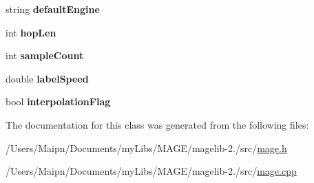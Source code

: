 \begin{DoxyCompactItemize}
\item 
\hypertarget{class_m_a_g_e_1_1_mage_a6da578b50f823123b9b14f210528fc92}{string {\bfseries default\-Engine}}\label{class_m_a_g_e_1_1_mage_a6da578b50f823123b9b14f210528fc92}

\item 
\hypertarget{class_m_a_g_e_1_1_mage_a98b6d2861a1d6302d50f588b8e41a054}{int {\bfseries hop\-Len}}\label{class_m_a_g_e_1_1_mage_a98b6d2861a1d6302d50f588b8e41a054}

\item 
\hypertarget{class_m_a_g_e_1_1_mage_a0301b5e7d0876dcf9f1424c7c1900e73}{int {\bfseries sample\-Count}}\label{class_m_a_g_e_1_1_mage_a0301b5e7d0876dcf9f1424c7c1900e73}

\item 
\hypertarget{class_m_a_g_e_1_1_mage_a755abfac229ab051cf7a2272bd0112a4}{double {\bfseries label\-Speed}}\label{class_m_a_g_e_1_1_mage_a755abfac229ab051cf7a2272bd0112a4}

\item 
\hypertarget{class_m_a_g_e_1_1_mage_ae013f381e433a8d38fdd91a0f6153c4b}{bool {\bfseries interpolation\-Flag}}\label{class_m_a_g_e_1_1_mage_ae013f381e433a8d38fdd91a0f6153c4b}

\end{DoxyCompactItemize}


The documentation for this class was generated from the following files\-:\begin{DoxyCompactItemize}
\item 
/\-Users/\-Maipn/\-Documents/my\-Libs/\-M\-A\-G\-E/magelib-\/2./src/\hyperlink{mage_8h}{mage.\-h}\item 
/\-Users/\-Maipn/\-Documents/my\-Libs/\-M\-A\-G\-E/magelib-\/2./src/\hyperlink{mage_8cpp}{mage.\-cpp}\end{DoxyCompactItemize}
